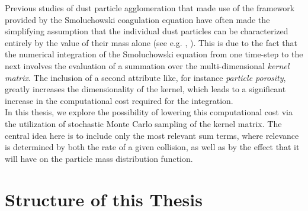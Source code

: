 Previous studies of dust particle agglomeration that made use of the framework provided by the 
Smoluchowski coagulation equation have often made the simplifying assumption that the individual 
dust particles can be characterized entirely by the value of their mass alone (see e.g. 
    \cite{dullemond_dominik_2004},
    \cite{birnstiel_dullemond_brauer_2010}). 
This is due to the fact that the numerical integration of the Smoluchowski equation from one 
time-step to the next involves the evaluation of a summation over 
the multi-dimensional \textit{kernel matrix}.
The inclusion of a second attribute like, for instance \textit{particle porosity}, greatly 
increases the dimensionality of the kernel, which leads to a significant increase in the 
computational cost required for the integration. \\

In this thesis, we explore the possibility of lowering this computational cost via the 
utilization of stochastic Monte Carlo sampling of the kernel matrix. The central idea here is 
to include only the most relevant sum terms, where relevance is determined by both the rate of 
a given collision,  as well as by the effect that it will have on the particle mass distribution
function. 







\section{Structure of this Thesis}

